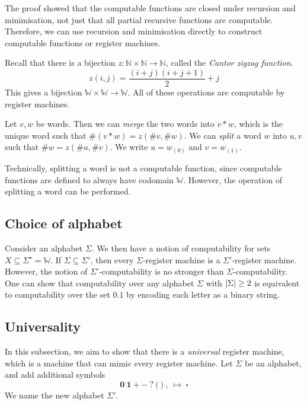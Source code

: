\begin{remark}
	The proof showed that the computable functions are closed under recursion and minimisation, not just that all partial recursive functions are computable.
	Therefore, we can use recursion and minimisation directly to construct computable functions or register machines.
\end{remark}
Recall that there is a bijection \( z \colon \mathbb N \times \mathbb N \to \mathbb N \), called the \emph{Cantor zigzag function}.
\[ z(i,j) = \frac{(i+j)(i+j+1)}{2} + j \]
This gives a bijection \( \mathbb W \times \mathbb W \to \mathbb W \).
All of these operations are computable by register machines.
\begin{definition}
	Let \( v, w \) be words.
	Then we can \emph{merge} the two words into \( v \ast w \), which is the unique word such that \( \#(v \ast w) = z(\#v, \#w) \).
	We can \emph{split} a word \( w \) into \( u, v \) such that \( \#w = z(\#u, \#v) \).
	We write \( u = w_{(0)} \) and \( v = w_{(1)} \).
\end{definition}
Technically, splitting a word is not a computable function, since computable functions are defined to always have codomain \( \mathbb W \).
However, the operation of splitting a word can be performed.

\subsection{Choice of alphabet}
Consider an alphabet \( \Sigma \).
We then have a notion of computability for sets \( X \subseteq \Sigma^\star = \mathbb W \).
If \( \Sigma \subseteq \Sigma' \), then every \( \Sigma \)-register machine is a \( \Sigma' \)-register machine.
However, the notion of \( \Sigma' \)-computability is no stronger than \( \Sigma \)-computability.
One can show that computability over any alphabet \( \Sigma \) with \( \abs{\Sigma} \geq 2 \) is equivalent to computability over the set \( \qty{0,1} \) by encoding each letter as a binary string.

\subsection{Universality}
In this subsection, we aim to show that there is a \emph{universal} register machine, which is a machine that can mimic every register machine.
Let \( \Sigma \) be an alphabet, and add additional symbols
\[ \bm 0\ \bm 1\ \bm +\ \bm -\ \bm ?\ \bm (\ \bm )\ \bm ,\ \bm \mapsto\ \bm \square \]
We name the new alphabet \( \Sigma' \).


